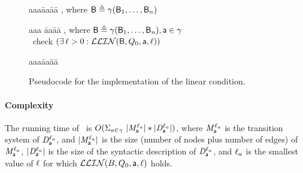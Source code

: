 \begin{figure}[H]
\setcounter{lctr}{0}
\begin{tabbing}\label{alg:check-df}
aaa\= aa\= aa\= \kill
{},  where $\mathsf{B} \triangleq \gamma(\mathsf{B}_1,\dots,\mathsf{B}_n)$\\
\lio{\ENDFOR;}
\end{tabbing}

\setcounter{lctr}{0}
\begin{tabbing}\label{alg:checkInt}
aaa \= aa\= aa\= \kill
{},  where $\mathsf{B} \triangleq \gamma(\mathsf{B}_1,\dots,\mathsf{B}_n), \mathsf{a} \in \gamma$\\
\cmnt\ check $(\exists\, \ell > 0: \mathcal{LLIN}(\mathsf{B}, Q_0, \mathsf{a}, \ell))$\\
\lio{\WHILEC{\ttt}}
\lio{\ENDWHILE}
\end{tabbing}

\setcounter{lctr}{0}
\begin{tabbing}
\label{alg:eval-ldfc}
aaa\= aa\= aa\= \kill
{}\\
  \lit{\FI}
\lio{\ENDFOR;}
\end{tabbing}

\caption{Pseudocode for the implementation of the linear condition.}

\label{fig:impl.locLin} 
\label{fig:implementation}
\label{fig:implementation-checkDF}
\end{figure}

\paragraph{Complexity} The running  time of \ is
$O(\Sigma_{a \in \gamma}\ |\mathit{M}_{\mathsf{a}}^{\ell_a}| * |\mathit{D}_{\mathsf{a}}^{\ell_a}|)$,
where 
$\mathit{M}_{\mathsf{a}}^{\ell_a}$ is the transition system of
$\mathit{D}_{\mathsf{a}}^{\ell_a}$, and $|\mathit{M}_{\mathsf{a}}^{\ell_a}|$ is the size (number of nodes plus number of edges) of 
$\mathit{M}_{\mathsf{a}}^{\ell_a}$, 
$|\mathit{D}_{\mathsf{a}}^{\ell_a}|$ is the size of the syntactic description of $\mathit{D}_{\mathsf{a}}^{\ell_a}$, and 
$\ell_a$ is the smallest value of $\ell$ for which $\mathcal{LLIN}(B, Q_0, \mathsf{a}, \ell)$ holds.


